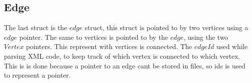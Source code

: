 \begin{minipage}{\linewidth}
\subsection{Edge}
The last struct is the $edge$ struct, this struct is pointed to by two vertices using a $edge$ pointer. The same to vertices is pointed to by the $edge$, using the two $Vertex$ pointers. This represent with vertices is connected.
The $edgeId$ used while parsing XML code, to keep track of which vertex is connected to which vertex.
This is is done because a pointer to an edge cant be stored in files, so ids is used to represent a pointer. 
 \label{edge_struct}
\end{minipage}


